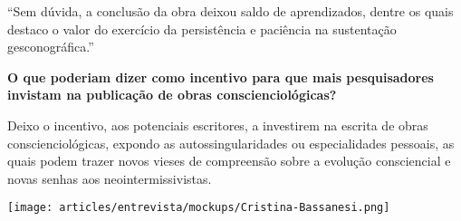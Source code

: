 \documentclass{gescons}
\begin{document}
\begin{multicols}{2}
\begin{pullquote}
``Sem dúvida, a conclusão da obra deixou saldo de aprendizados, dentre os quais destaco o valor do exercício da persistência e paciência na sustentação gesconográfica.''
\end{pullquote}

\textbf{O que poderiam dizer como incentivo para que mais pesquisadores invistam na publicação de obras conscienciológicas?}

Deixo o incentivo, aos potenciais escritores, a investirem na escrita de obras conscienciológicas, expondo as autossingularidades ou especialidades pessoais, as quais podem trazer novos vieses de compreensão sobre a evolução consciencial e novas senhas aos neointermissivistas. 


\begin{center}
    \texttt{[image: articles/entrevista/mockups/Cristina-Bassanesi.png]}
\end{center}
    
    \end{multicols}
\end{document}

